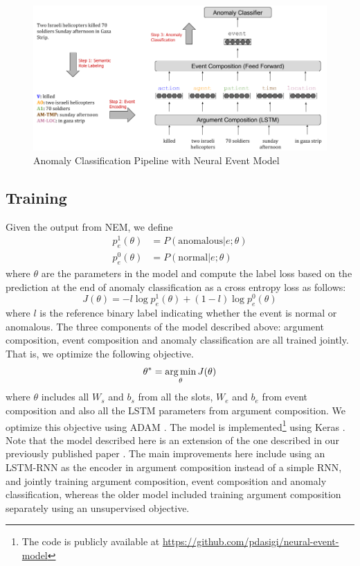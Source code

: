\begin{figure}
  \begin{center}
  \includegraphics[width=6.5in]{figures/nem_pipeline.png}
  \caption{Anomaly Classification Pipeline with Neural Event Model}
  \label{fig:nem}
  \end{center}
\end{figure}

\subsection{Training}
Given the output from NEM, we define
\begin{align}
 p^1_e(\theta) &= P(\text{anomalous} | e; \theta) \\
 p^0_e(\theta) &= P(\text{normal} | e; \theta)
\end{align}
where $\theta$ are the parameters in the model and compute the label loss based on the prediction at the end of anomaly classification as a cross entropy loss as follows:
\begin{equation}
J(\theta) = - l \log p^1_e(\theta) + (1-l) \log p^0_e(\theta)
\end{equation}
where $l$ is the reference binary label indicating whether the event is normal or
anomalous. The three components of the model described above: argument composition, event composition and anomaly classification are all trained jointly.
That is, we optimize the following objective.
\begin{equation}
 \theta^* = \operatorname*{arg\,min}_{\theta} J(\theta)
\end{equation}
where $\theta$ includes all $W_s$ and $b_s$ from all the slots, $W_e$ and $b_e$ from event composition and also all the LSTM parameters from argument composition.
We optimize this objective using ADAM \citep{kingma2014adam}. The model is implemented\footnote{The code is publicly available at \url{https://github.com/pdasigi/neural-event-model}}
using Keras \citep{chollet2015keras}. Note that the model described here is an extension of the one described in our previously published paper \citep{dasigi2014modeling}.
The main improvements here include using an LSTM-RNN as the encoder in argument composition instead of a simple RNN, and jointly training argument composition, event composition and anomaly classification,
whereas the older model included training argument composition separately using an unsupervised objective.

